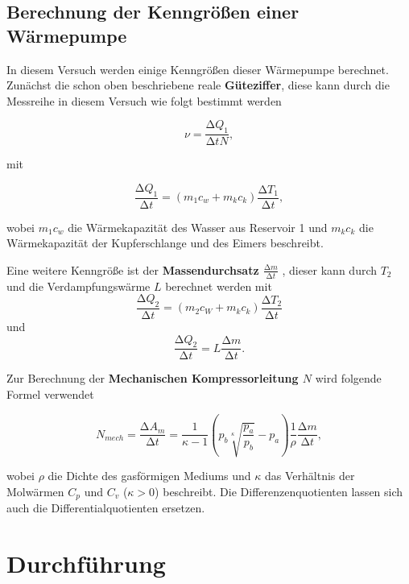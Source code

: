\subsection{Berechnung der Kenngrößen einer Wärmepumpe}
In diesem Versuch werden einige Kenngrößen dieser Wärmepumpe berechnet.
Zunächst die schon oben beschriebene reale \textbf{Güteziffer}, diese kann durch die Messreihe in diesem Versuch wie folgt bestimmt werden

\begin{equation}
  \label{Güteziffer}
    \nu = \frac{\increment Q_1}{\increment t N},
\end{equation}

mit

\begin{equation}
  \label{Güteziffer2}
  \frac{\increment Q_1}{\increment t} = (m_1c_w + m_kc_k) \frac{\increment T_1}{\increment t},
\end{equation}

wobei $m_1 c_w$ die Wärmekapazität des Wasser aus Reservoir 1 und $m_k c_k$ die Wärmekapazität der Kupferschlange und des Eimers beschreibt.

Eine weitere Kenngröße ist der \textbf{Massendurchsatz $ \frac{\increment m}{\increment t}$ }, dieser kann durch $T_2$ und die Verdampfungswärme $L$ berechnet werden mit
 \begin{equation}
   \label{Massendurchsatz1}
   \frac{\increment Q_2}{\increment t} = (m_2 c_W + m_k c_k) \frac{\increment T_2}{\increment t}
 \end{equation}
und
\begin{equation}
  \label{Massendurchsatz2}
  \frac{\increment Q_2}{\increment t} = L \frac{\increment m}{\increment t} .
\end{equation}

Zur Berechnung der \textbf{Mechanischen Kompressorleitung $N$} wird folgende Formel verwendet

\begin{equation}
  \label{Leistung}
  N_{mech} = \frac{\increment A_m}{\increment t} =  \frac{1}{\kappa - 1} \left( p_b \sqrt[\kappa]{\frac{p_a}{p_b}} - p_a \right) \frac{1}{\rho} \frac{\increment m}{\increment t},
\end{equation}

wobei $\rho$ die Dichte des gasförmigen Mediums und $\kappa$ das Verhältnis der Molwärmen $C_p$ und $C_v$ ($\kappa>0$) beschreibt.
Die Differenzenquotienten lassen sich auch die Differentialquotienten ersetzen.

\section{Durchführung}

